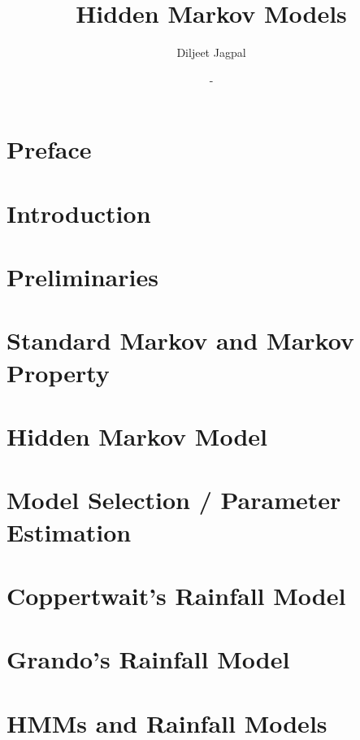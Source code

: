 \documentclass[a4paper,12pt]{report}
\title{\Huge Hidden Markov Models}
\author{Diljeet Jagpal}
\date{-}
\theoremstyle{plain}
\begin{document}
	\maketitle
	\tableofcontents

	\chapter*{Preface}
	

	\newpage

	\chapter{Introduction}
	
	\newpage

	\chapter{Preliminaries}
	
	\newpage

	\chapter{Standard Markov and Markov Property}
	
	\newpage

	\chapter{Hidden Markov Model}
	
	\newpage

	\chapter{Model Selection  / Parameter Estimation}
	
	\newpage

	\chapter{Coppertwait's Rainfall Model}
	
	\newpage

	\chapter{Grando's Rainfall Model}
	
	\newpage

	\chapter{HMMs and Rainfall Models}
	
	\newpage


	\nocite{*}
	\printbibliography
\end{document}
